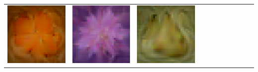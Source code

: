\documentclass[main.tex]{subfiles}
\begin{document}
{\begin{center}
\begin{tabular}{ccccccccccc}
    \includegraphics[align=c,width=\coverwidth\linewidth]{figures/cover/cifar/orange_0.pdf} &
    \includegraphics[align=c,width=\coverwidth\linewidth]{figures/cover/cifar/orchid_0.pdf} &
    \includegraphics[align=c,width=\coverwidth\linewidth]{figures/cover/cifar/pear_0.pdf} &

\end{tabular}
\end{center}}
\end{document}
